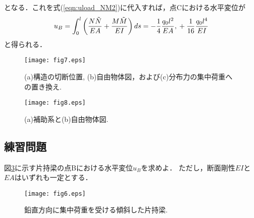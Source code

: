 ﻿\documentclass[10pt,a4j]{jarticle}
\begin{document}
となる．これを式(\ref{eqn:uload_NM2})に代入すれば，点Cにおける水平変位が
\begin{equation}
	u_B=
	\int_0^l \left( 
		\frac{N \tilde N }{EA}
		+
		\frac{M \tilde M }{EI}
	\right)
	ds 
	= 
	 -\frac{1}{4}\frac{q_0l^2}{EA}, \\
	 +\frac{1}{16}\frac{q_0l^4}{EI}
	\label{eqn:}
\end{equation}
と得られる．
\begin{figure}[h]
	\begin{center}
	\texttt{[image: fig7.eps]} 
	\end{center}
	\caption{(a)構造の切断位置, (b)自由物体図，および(c)分布力の集中荷重への置き換え.} 
	\label{fig:fig7}
\end{figure}
\begin{figure}[h]
	\begin{center}
	\texttt{[image: fig8.eps]} 
	\end{center}
	\caption{(a)補助系と(b)自由物体図.} 
	\label{fig:fig8}
\end{figure}
\subsection{練習問題}
図\ref{fig:fig6}に示す片持梁の点Bにおける水平変位$u_B$を求めよ．
ただし，断面剛性$EI$と$EA$はいずれも一定とする．
\begin{figure}[h]
	\begin{center}
	\texttt{[image: fig6.eps]} 
	\end{center}
	\caption{鉛直方向に集中荷重を受ける傾斜した片持梁.} 
	\label{fig:fig6}
\end{figure}
\end{document}
